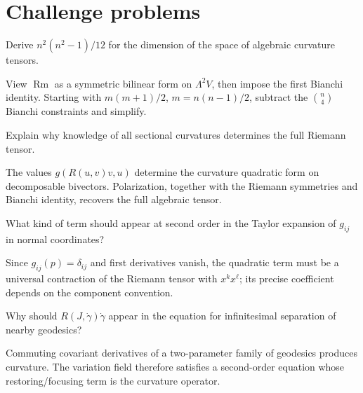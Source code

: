 \section{Challenge problems}
\begin{problem}\label{prob:vii26-ch01}
Derive \(n^2(n^2-1)/12\) for the dimension of the space of algebraic curvature tensors.
\end{problem}
\begin{solution}
View \(\operatorname{Rm}\) as a symmetric bilinear form on \(\Lambda^2V\), then impose the first Bianchi identity. Starting with \(m(m+1)/2\), \(m=n(n-1)/2\), subtract the \(\binom n4\) Bianchi constraints and simplify.
\end{solution}

\begin{problem}\label{prob:vii26-ch02}
Explain why knowledge of all sectional curvatures determines the full Riemann tensor.
\end{problem}
\begin{solution}
The values \(g(R(u,v)v,u)\) determine the curvature quadratic form on decomposable bivectors. Polarization, together with the Riemann symmetries and Bianchi identity, recovers the full algebraic tensor.
\end{solution}

\begin{problem}\label{prob:vii26-ch03}
What kind of term should appear at second order in the Taylor expansion of \(g_{ij}\) in normal coordinates?
\end{problem}
\begin{solution}
Since \(g_{ij}(p)=\delta_{ij}\) and first derivatives vanish, the quadratic term must be a universal contraction of the Riemann tensor with \(x^kx^\ell\); its precise coefficient depends on the component convention.
\end{solution}

\begin{problem}\label{prob:vii26-ch04}
Why should \(R(J,\dot\gamma)\dot\gamma\) appear in the equation for infinitesimal separation of nearby geodesics?
\end{problem}
\begin{solution}
Commuting covariant derivatives of a two-parameter family of geodesics produces curvature. The variation field therefore satisfies a second-order equation whose restoring/focusing term is the curvature operator.
\end{solution}

